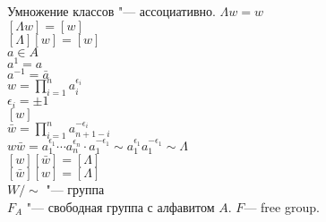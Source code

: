 Умножение классов "--- ассоциативно.
$\Lambda w = w$\\
$[\Lambda w] = [w]$\\
$[\Lambda][w] = [w]$\\

$a \in A$ \\
$a^1 = a$\\
$a^{-1} = \bar{a}$\\
$w = \prod_{i = 1}^{n} a_i^{\epsilon_i}$\\
$\epsilon_i = \pm 1$\\
$[w]$\\
$\bar{w} = \prod_{i = 1}^{n} a_{n + 1 - i}^{-\epsilon_i}$\\
$w\bar{w} = a_1^{\epsilon_1} \cdots a_n^{\epsilon_n} \cdot a_1^{-\epsilon_1} \sim a_1^{\epsilon_1}a_1^{-\epsilon_1} \sim \Lambda$\\
$[w][\bar{w}] = [\Lambda]$\\
$[\bar{w}][w] = [\Lambda]$\\
$W/\sim$ "--- группа\\
$F_A$ "--- свободная группа с алфавитом $A$.
$F$--- free group.

